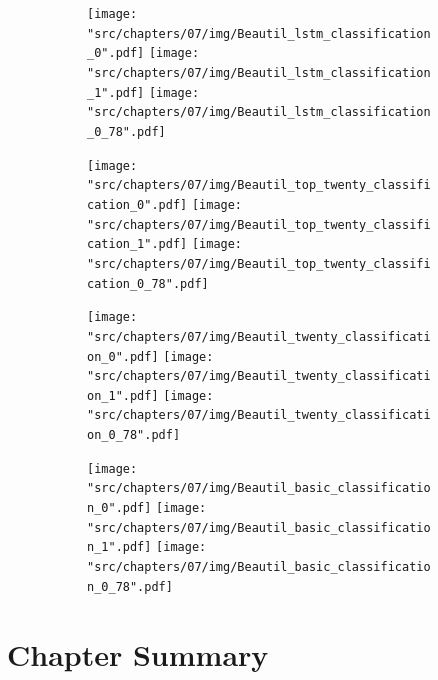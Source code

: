 \begin{figure}[!htbp]
    \begin{subfigure}{\textwidth}
        \texttt{[image: "src/chapters/07/img/Beautil\_lstm\_classification\_0".pdf]}
        \texttt{[image: "src/chapters/07/img/Beautil\_lstm\_classification\_1".pdf]}
        \texttt{[image: "src/chapters/07/img/Beautil\_lstm\_classification\_0\_78".pdf]}
    \end{subfigure}
    \begin{subfigure}{\textwidth}
        \texttt{[image: "src/chapters/07/img/Beautil\_top\_twenty\_classification\_0".pdf]}
        \texttt{[image: "src/chapters/07/img/Beautil\_top\_twenty\_classification\_1".pdf]}
        \texttt{[image: "src/chapters/07/img/Beautil\_top\_twenty\_classification\_0\_78".pdf]}
    \end{subfigure}
    \begin{subfigure}{\textwidth}
        \texttt{[image: "src/chapters/07/img/Beautil\_twenty\_classification\_0".pdf]}
        \texttt{[image: "src/chapters/07/img/Beautil\_twenty\_classification\_1".pdf]}
        \texttt{[image: "src/chapters/07/img/Beautil\_twenty\_classification\_0\_78".pdf]}
    \end{subfigure}
    \begin{subfigure}{\textwidth}
        \texttt{[image: "src/chapters/07/img/Beautil\_basic\_classification\_0".pdf]}
        \texttt{[image: "src/chapters/07/img/Beautil\_basic\_classification\_1".pdf]}
        \texttt{[image: "src/chapters/07/img/Beautil\_basic\_classification\_0\_78".pdf]}
    \end{subfigure}
\end{figure}


\section{Chapter Summary}
